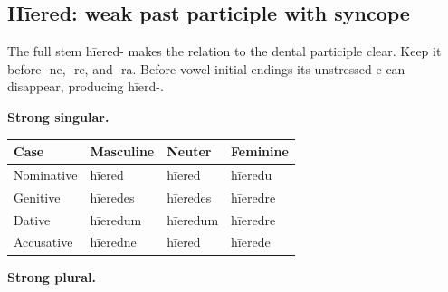 \subsection*{Hīered: weak past participle with syncope}

The full stem hīered- makes the relation to the dental participle clear. Keep it before -ne, -re, and -ra. Before vowel-initial endings its unstressed e can disappear, producing hīerd-.

\textbf{Strong singular.}

\par\begingroup
\fontsize{10.5}{13.2}\selectfont
\setlength{\LTleft}{0pt}\setlength{\LTright}{\fill}
\noindent
\begin{tabular}{@{}>{\raggedright\arraybackslash}p{22.0mm}>{\raggedright\arraybackslash}p{31.188mm}>{\raggedright\arraybackslash}p{31.188mm}>{\raggedright\arraybackslash}p{31.188mm}@{}}
\toprule
\textbf{Case} & \textbf{Masculine} & \textbf{Neuter} & \textbf{Feminine} \\
\midrule
Nominative & hīered & hīered & hīeredu \\
Genitive & hīeredes & hīeredes & hīeredre \\
Dative & hīeredum & hīeredum & hīeredre \\
Accusative & hīeredne & hīered & hīerede \\
\bottomrule
\end{tabular}
\par\endgroup
\textbf{Strong plural.}


